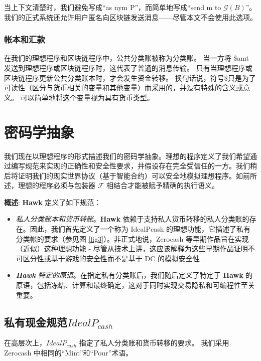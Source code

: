 \documentclass{xduugtrans}
\begin{document}
当上下文清楚时，我们避免写成“as nym P”，而简单地写成“send m to $\mathcal{G} ( B )$”。我们的正式系统还允许用户匿名向区块链发送消息——尽管本文不会使用此选项。

\subsection{帐本和汇款}

在我们的理想程序和区块链程序中，公共分类账被称为分类账。 当一方将 \$amt 发送到理想程序或区块链程序时，这代表了普通的消息传输。 只有当理想程序或区块链程序更新公共分类账本时，才会发生资金转移。 换句话说，符号\$只是为了可读性（区分与货币相关的变量和其他变量）而采用的，并没有特殊的含义或意义。 可以简单地将这个变量视为具有货币类型。

\chapter{密码学抽象}

我们现在以理想程序的形式描述我们的密码学抽象。理想的程序定义了我们希望通过编写规范来实现的正确性和安全性要求，并假设存在完全受信任的一方。我们稍后将证明我们的现实世界协议（基于智能合约）可以安全地模拟理想程序。如前所述，理想的程序必须与包装器 $\mathcal{F}$ 相结合才能被赋予精确的执行语义。

\textbf{概述}: \textbf{Hawk} 定义了如下规范：

\begin{itemize}
    \item \textit{私人分类账本和货币转账}。\textbf{Hawk} 依赖于支持私人货币转移的私人分类账的存在。因此，我们首先定义了一个称为 IdealPcash 的理想功能，它描述了私有分类帐的要求（参见图 \ref{fig3}）。非正式地说，Zerocash \cite{ref11} 等早期作品旨在实现（近似）这种理想功能 - 尽管从技术上讲，这应该解释为这些早期作品证明不可区分性或基于游戏的安全性而不是基于 DC 的模拟安全性 .
    \item \textit{\textbf{Hawk} 特定的原语}。在指定私有分类账后，我们随后定义了特定于 \textbf{Hawk} 的原语，包括冻结、计算和最终确定，这对于同时实现交易隐私和可编程性至关重要。
\end{itemize}

\section{私有现金规范$IdealP_{cash}$ }

在高层次上，$IdealP_{cash}$ 指定了私人分类账和货币转移的要求。 我们采用 Zerocash \cite{ref11} 中相同的“Mint”和“Pour”术语。
\end{document}
